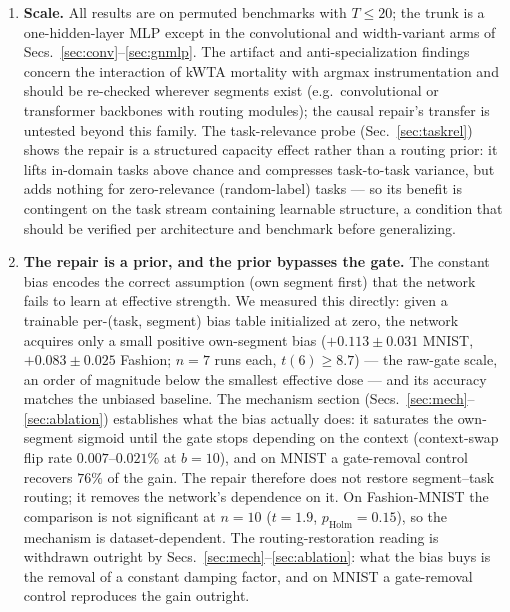 \documentclass[10pt]{article}
\begin{document}
\begin{enumerate}
\item \textbf{Scale.} All results are on permuted benchmarks with $T \le 20$; the trunk is a
      one-hidden-layer MLP except in the convolutional and width-variant arms
      of Secs.~\ref{sec:conv}--\ref{sec:gnmlp}. The artifact and
      anti-specialization findings concern the interaction of kWTA
      mortality with argmax instrumentation and should be re-checked
      wherever segments exist (e.g.\ convolutional or transformer backbones
      with routing modules); the causal repair's transfer is untested
      beyond this family. The task-relevance probe
      (Sec.~\ref{sec:taskrel}) shows the repair is a structured capacity
      effect rather than a routing prior: it lifts in-domain tasks above
      chance and compresses task-to-task variance, but adds nothing for
      zero-relevance (random-label) tasks --- so its benefit is
      contingent on the task stream containing learnable structure, a
      condition that should be verified per architecture and benchmark
      before generalizing.
\item \textbf{The repair is a prior, and the prior bypasses the gate.}
      The constant bias
      encodes the correct assumption (own segment first) that the network
      fails to learn at effective strength. We measured this directly:
      given a trainable per-(task, segment) bias table initialized at
      zero, the network acquires only a small positive own-segment bias
      ($+0.113 \pm 0.031$ MNIST, $+0.083 \pm 0.025$ Fashion; $n{=}7$
      runs each, $t(6) \ge 8.7$) --- the raw-gate scale, an order of
      magnitude below the smallest effective dose --- and its accuracy
      matches the unbiased baseline. The mechanism section (Secs.~\ref{sec:mech}--\ref{sec:ablation}) establishes what the bias actually
does: it saturates the own-segment sigmoid until the gate stops
      depending on the context (context-swap flip rate $0.007$--$0.021\%$ at
      $b{=}10$), and on MNIST a gate-removal control recovers $76\%$ of the
      gain. The repair therefore does not restore segment--task routing;
      it removes the network's dependence on it. On Fashion-MNIST the
      comparison is not significant at $n{=}10$ ($t{=}1.9$, $p_{\mathrm{Holm}}=0.15$),
      so the mechanism is dataset-dependent. The routing-restoration reading
      is withdrawn outright by Secs.~\ref{sec:mech}--\ref{sec:ablation}:
      what the bias buys is the removal of a constant damping factor,
      and on MNIST a gate-removal control reproduces the gain outright.

\end{enumerate}
\end{document}
